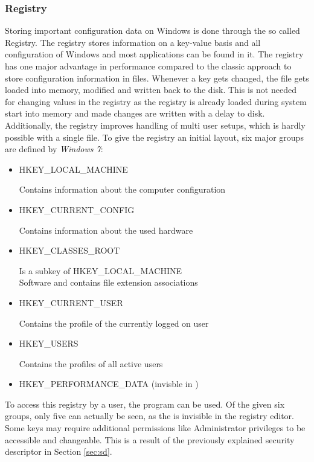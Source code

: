 \subsubsection{Registry}
Storing important configuration data on Windows is done through the so called Registry. The registry stores information on a key-value basis and all configuration of Windows and most applications can be found in it. The registry has one major advantage in performance compared to the classic approach to store configuration information in  files. Whenever a key gets changed, the  file gets loaded into memory, modified and written back to the disk. This is not needed for changing values in the registry as the registry is already loaded during system start into memory and made changes are written with a delay to disk. Additionally, the registry improves handling of multi user setups, which is hardly possible with a single  file. To give the registry an initial layout, six major groups are defined by \emph{Windows 7}:
\begin{itemize}
\label{sec:registrykeys}
\item HKEY\_LOCAL\_MACHINE

Contains information about the computer configuration
\item HKEY\_CURRENT\_CONFIG

Contains information about the used hardware
\item HKEY\_CLASSES\_ROOT

Is a subkey of HKEY\_LOCAL\_MACHINE\\Software and contains file extension associations
\item HKEY\_CURRENT\_USER 

Contains the profile of the currently logged on user
\item HKEY\_USERS

Contains the profiles of all active users
\item HKEY\_PERFORMANCE\_DATA (invisble in )
\end{itemize}
To access this registry by a user, the  \cite{msdn_regedit} program can be used. Of the given six groups, only five can actually be seen, as the  is invisible in the registry editor. Some keys may require additional permissions like Administrator privileges to be accessible and changeable. This is a result of the previously explained security descriptor in Section \ref{sec:sd}.